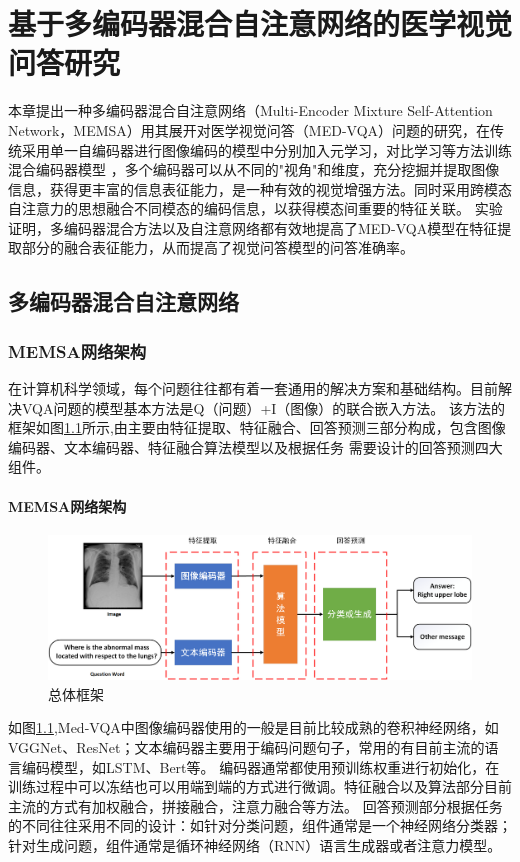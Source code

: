 \chapter{基于多编码器混合自注意网络的医学视觉问答研究}
本章提出一种多编码器混合自注意网络（Multi-Encoder Mixture Self-Attention Network，MEMSA）用其展开对医学视觉问答（MED-VQA）问题的研究，在传统采用单一自编码器进行图像编码的模型中分别加入元学习，对比学习等方法训练混合编码器模型
，多个编码器可以从不同的"视角"和维度，充分挖掘并提取图像信息，获得更丰富的信息表征能力，是一种有效的视觉增强方法\cite{nguyen2019overcoming}。同时采用跨模态自注意力的思想融合不同模态的编码信息，以获得模态间重要的特征关联。
实验证明，多编码器混合方法以及自注意网络都有效地提高了MED-VQA模型在特征提取部分的融合表征能力，从而提高了视觉问答模型的问答准确率。

\section{多编码器混合自注意网络}
\subsection{MEMSA网络架构}
在计算机科学领域，每个问题往往都有着一套通用的解决方案和基础结构。目前解决VQA问题的模型基本方法是Q（问题）+I（图像）的联合嵌入方法\cite{malinowski2015ask}。
该方法的框架如图\ref{Framwork}所示,由主要由特征提取、特征融合、回答预测三部分构成，包含图像编码器、文本编码器、特征融合算法模型以及根据任务
需要设计的回答预测四大组件。

\subsubsection*{MEMSA网络架构}
\begin{figure}[htbp]
	\centering	
	\includegraphics[width=1\textwidth]{Fig/myfig/chapter3/popline2.png}  %
	\caption{\label{Framwork}总体框架} 
\end{figure}
如图\ref{Framwork},Med-VQA中图像编码器使用的一般是目前比较成熟的卷积神经网络，如VGGNet、ResNet；文本编码器主要用于编码问题句子，常用的有目前主流的语言编码模型，如LSTM、Bert等。
编码器通常都使用预训练权重进行初始化，在训练过程中可以冻结也可以用端到端的方式进行微调。特征融合以及算法部分目前主流的方式有加权融合，拼接融合，注意力融合等方法。
回答预测部分根据任务的不同往往采用不同的设计：如针对分类问题，组件通常是一个神经网络分类器；针对生成问题，组件通常是循环神经网络（RNN）语言生成器或者注意力模型。

